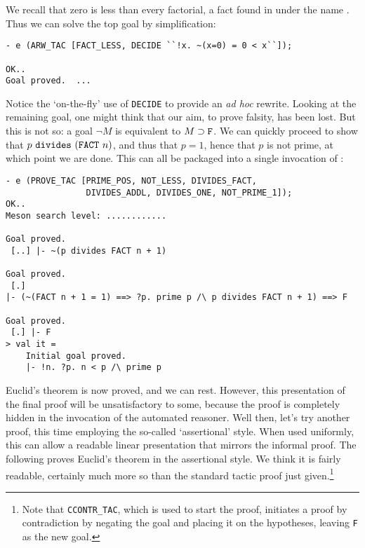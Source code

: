     We recall that zero is less than every factorial, a fact found in
     under the name . Thus we can
    solve the top goal by simplification:
\begin{session}\begin{verbatim}
- e (ARW_TAC [FACT_LESS, DECIDE ``!x. ~(x=0) = 0 < x``]);

OK..
Goal proved.  ...
\end{verbatim}\end{session}
Notice the `on-the-fly' use of \verb+DECIDE+ to provide an {\it ad hoc\/}
rewrite. Looking at the remaining goal, one might think that our aim, to
prove falsity, has been lost. But this is not so: a goal $\neg
M$ is equivalent to $M \supset \mbox{\tt F}$. We can quickly proceed to
show that $p \ \mbox{\tt divides}\ (\mbox{\tt FACT}\ n)$, and thus that
$p = 1$, hence that $p$ is not prime, at which point we are done. This
can all be packaged into a single invocation of :
\begin{session}\begin{verbatim}
- e (PROVE_TAC [PRIME_POS, NOT_LESS, DIVIDES_FACT,
                DIVIDES_ADDL, DIVIDES_ONE, NOT_PRIME_1]);
OK..
Meson search level: ............

Goal proved.
 [..] |- ~(p divides FACT n + 1)

Goal proved.
 [.]
|- (~(FACT n + 1 = 1) ==> ?p. prime p /\ p divides FACT n + 1) ==> F

Goal proved.
 [.] |- F
> val it =
    Initial goal proved.
    |- !n. ?p. n < p /\ prime p
\end{verbatim}\end{session}
    Euclid's theorem is now proved, and we can rest. However, this
    presentation of the final proof will be unsatisfactory to some,
    because the proof is completely hidden in the invocation of the
    automated reasoner. Well then, let's try another proof, this time
    employing the so-called `assertional' style. When used uniformly,
    this can allow a readable linear presentation that mirrors the
    informal proof. The following proves Euclid's theorem in the
    assertional style. We think it is fairly readable, certainly much
    more so than the standard tactic proof just given.\footnote{Note
      that {\tt CCONTR\_TAC}, which is used to start the proof,
      initiates a proof by contradiction by negating the goal and
      placing it on the hypotheses, leaving {\tt F} as the new goal.}

